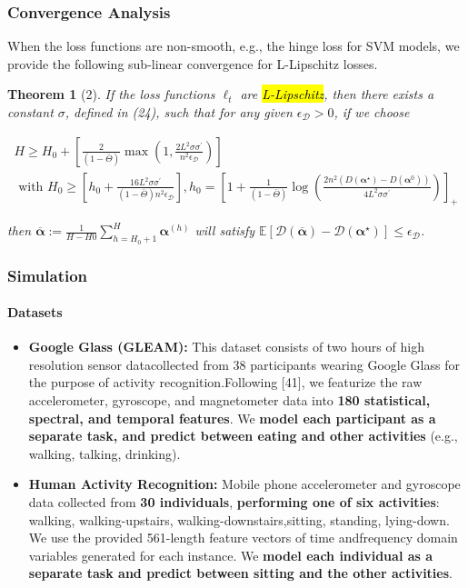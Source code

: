 \documentclass[UTF8,aspectratio=169,presentation]{ctexbeamer}
\makeatletter
\let\HL\hl
\renewcommand\hl{%
  \let\set@color\beamerorig@set@color
  \let\reset@color\beamerorig@reset@color
  \HL}
\newtheorem{mytheorem}{Theorem}
\makeatother
\begin{document}
\begin{frame}[t]
  \frametitle{Convergence Analysis}
When the loss functions are non-smooth, e.g., the hinge loss for SVM models, we provide the
following sub-linear convergence for L-Lipschitz losses.

\begin{mytheorem}[2]
  If the loss functions $\ell_t$ are \hl{L-Lipschitz}, then there exists a constant $\sigma$, defined in (24),
  such that for any given $\epsilon_{\mathcal D} > 0$, if we choose

$$
\begin{array}{c}
H \geq H_{0}+\left[\frac{2}{(1-\bar{\Theta})} \max \left(1, \frac{2 L^{2} \sigma \sigma^{\prime}}{n^{2} \epsilon_{\mathcal{D}}}\right)\right] \\
\text { with } H_{0} \geq\left[h_{0}+\frac{16 L^{2} \sigma \sigma^{\prime}}{(1-\bar{\Theta}) n^{2} \epsilon_{\mathcal{D}}}\right], h_{0}=\left[1+\frac{1}{(1-\bar{\Theta})} \log \left(\frac{2 n^{2}\left(D\left(\boldsymbol{\alpha}^{\star}\right)-D\left(\boldsymbol{\alpha}^{0}\right)\right)}{4 L^{2} \sigma \sigma^{\prime}}\right)\right]_{+}
\end{array}
$$

then $
\overline{\boldsymbol{\alpha}}:=\frac{1}{H-H 0} \sum_{h=H_{0}+1}^{H} \boldsymbol{\alpha}^{(h)}
$ will satisfy $
\mathbb{E}\left[\mathcal{D}(\overline{\boldsymbol{\alpha}})-\mathcal{D}\left(\boldsymbol{\alpha}^{\star}\right)\right] \leq \epsilon_{\mathcal{D}}
$.
  
\end{mytheorem}


  
\end{frame}

\begin{frame}[t]
  \frametitle{Simulation}
  \framesubtitle{Datasets}

\begin{itemize}
  \item \textbf{Google Glass (GLEAM):} This dataset consists of two hours of high resolution sensor datacollected from 38 participants wearing Google Glass for the purpose of activity recognition.Following [41], we featurize the raw accelerometer, gyroscope, and magnetometer data into \textbf{180 statistical, spectral, and temporal features}.  We \textbf{model each participant as a separate task, and predict between eating and other activities} (e.g., walking, talking, drinking).
  \item \textbf{Human Activity Recognition:} Mobile phone accelerometer and gyroscope data collected from \textbf{30 individuals}, \textbf{performing one of six activities}: {walking, walking-upstairs, walking-downstairs,sitting,  standing,  lying-down}.   We  use  the  provided  561-length  feature  vectors  of  time  andfrequency domain variables generated for each instance.  We \textbf{model each individual as a separate task and predict between sitting and the other activities}.
\end{itemize}
\end{frame}
\end{document}
